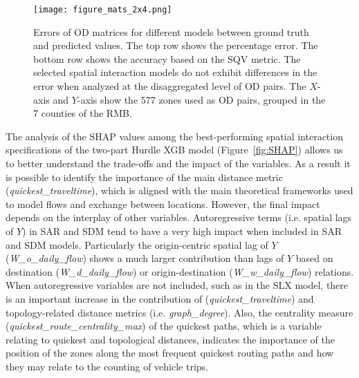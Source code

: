 \begin{figure}[h!]
    \centering
    \texttt{[image: figure\_mats\_2x4.png]}
    \caption{Errors of OD matrices for different models between ground truth and predicted values. The top row shows the percentage error. The bottom row shows the accuracy based on the SQV metric. The selected spatial interaction models do not exhibit differences in the error when analyzed at the disaggregated level of OD pairs. The $X$-axis and $Y$-axis show the 577 zones used as OD pairs, grouped in the 7 counties of the RMB.}
    \label{fig:Hurdle_SLX_matrices}
\end{figure}

The analysis of the SHAP values \citep{Lundberg2017APredictions} among the best-performing spatial interaction specifications of the two-part Hurdle XGB model (Figure~\ref{fig:SHAP}) allows us to better understand the trade-offs %
and the impact of the variables. As a result it is possible to identify the importance of the main distance metric (\emph{quickest\_traveltime}), which is aligned with the main theoretical frameworks used to model flows and exchange between locations. However, the final impact depends on the interplay of other variables. Autoregressive terms (i.e. spatial lags of $Y$) in SAR and SDM tend to have a very high impact when included in SAR and SDM models. Particularly the origin-centric spatial lag of $Y$ (\emph{W\_o\_daily\_flow}) shows a much larger contribution than lags of $Y$ based on destination (\emph{W\_d\_daily\_flow}) or origin-destination (\emph{W\_w\_daily\_flow}) relations. When autoregressive variables are not included, such as in the SLX model, there is an important increase in the contribution of (\emph{quickest\_traveltime}) and topology-related distance metrics (i.e. \emph{graph\_degree}). Also, the centrality measure  (\emph{quickest\_route\_centrality\_max}) of the quickest paths, which is a variable relating to quickest and topological distances, indicates the importance of the position of the zones along the most frequent quickest routing paths and how they may relate to the counting of vehicle trips.

